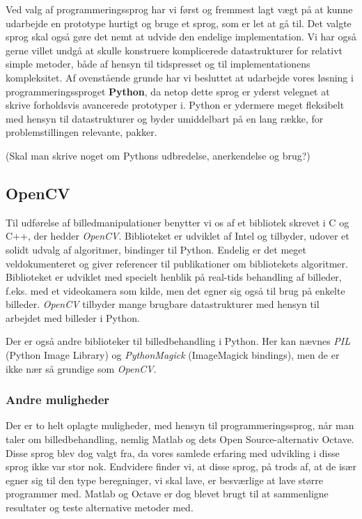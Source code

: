 {
Ved valg af programmeringssprog har vi først og fremmest lagt vægt på at
kunne udarbejde en prototype hurtigt og bruge et sprog, som er let at gå
til. Det valgte sprog skal også gøre det nemt at udvide den endelige
implementation. Vi har også gerne villet undgå at skulle konstruere
komplicerede datastrukturer for relativt simple metoder, både af hensyn
til tidspresset og til implementationens kompleksitet. Af ovenstående
grunde har vi besluttet at udarbejde vores løsning i
programmeringssproget \textbf{Python}, da netop dette sprog er yderst
velegnet at skrive forholdsvis avancerede prototyper i. Python er
ydermere meget fleksibelt med hensyn til datastrukturer og byder
umiddelbart på en lang række, for problemstillingen relevante, pakker.

(Skal man skrive noget om Pythons udbredelse, anerkendelse og brug?)

\subsection{OpenCV}
Til udførelse af billedmanipulationer benytter vi os af et bibliotek skrevet
i C og C++, der hedder \emph{OpenCV}. Biblioteket er udviklet af Intel
og tilbyder, udover et solidt udvalg af algoritmer, bindinger til
Python.  Endelig er det meget veldokumenteret og giver referencer til
publikationer om bibliotekets algoritmer. Biblioteket er udviklet med
specielt henblik på real-tids behandling af billeder, f.eks. med et
videokamera som kilde, men det egner sig også til brug på enkelte
billeder.  \emph{OpenCV} tilbyder mange brugbare datastrukturer med
hensyn til arbejdet med billeder i Python.

Der er også andre biblioteker til billedbehandling i Python. Her kan
nævnes \emph{PIL} (Python Image Library) og \emph{PythonMagick}
(ImageMagick bindings), men de er ikke nær så grundige som
\emph{OpenCV}.

\subsubsection{Andre muligheder}
Der er to helt oplagte muligheder, med hensyn til programmeringssprog,
når man taler om billedbehandling, nemlig Matlab og dets Open
Source-alternativ Octave. Disse sprog blev dog valgt fra, da vores
samlede erfaring med udvikling i disse sprog ikke var stor nok.
Endvidere finder vi, at disse sprog, på trods af, at de især egner sig
til den type beregninger, vi skal lave, er besværlige at lave større
programmer med. Matlab og Octave er dog blevet brugt til at sammenligne
resultater og teste alternative metoder med.

}
